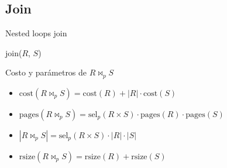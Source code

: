 \subsection{Join}
Nested loops join
\begin{paracol}{2}
  \begin{algorithm}
    \caption{join($R$, $S$)}
    \DontPrintSemicolon
  
  
  \end{algorithm}

  \switchcolumn

  Costo y parámetros de $R \bowtie_p S$
  \begin{itemize}
    \item $\text{cost}(R \bowtie_p S) = \text{cost}(R) + |R| \cdot \text{cost}(S)$
    \item $\text{pages}(R \bowtie_p S) = \text{sel}_p(R \times S) \cdot \text{pages}(R) \cdot \text{pages}(S)$
    \item $|R \bowtie_p S| = \text{sel}_p(R \times S) \cdot |R| \cdot |S|$
    \item $\text{rsize}(R \bowtie_p S) = \text{rsize}(R) + \text{rsize}(S)$
  \end{itemize}
\end{paracol}

